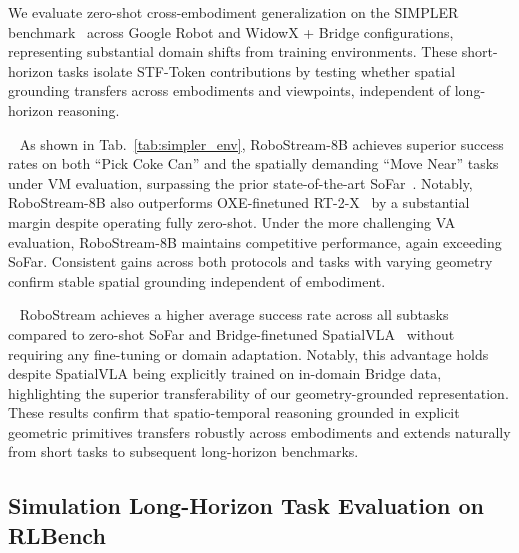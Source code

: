 We evaluate zero-shot cross-embodiment generalization on the SIMPLER benchmark~\cite{li2025evaluating} across Google Robot and WidowX + Bridge configurations, representing substantial domain shifts from training environments. These short-horizon tasks isolate STF-Token contributions by testing whether spatial grounding transfers across embodiments and viewpoints, independent of long-horizon reasoning.

~
As shown in Tab.~\ref{tab:simpler_env}, RoboStream-8B achieves superior success rates on both ``Pick Coke Can'' and the spatially demanding ``Move Near'' tasks under VM evaluation, surpassing the prior state-of-the-art SoFar~\cite{qisofar}. Notably, RoboStream-8B also outperforms OXE-finetuned RT-2-X~\cite{zitkovich2023rt} by a substantial margin despite operating fully zero-shot. Under the more challenging VA evaluation, RoboStream-8B maintains competitive performance, again exceeding SoFar. Consistent gains across both protocols and tasks with varying geometry confirm stable spatial grounding independent of embodiment.

~
RoboStream achieves a higher average success rate across all subtasks compared to zero-shot SoFar and Bridge-finetuned SpatialVLA~\cite{qu2025spatialvla} without requiring any fine-tuning or domain adaptation. Notably, this advantage holds despite SpatialVLA being explicitly trained on in-domain Bridge data, highlighting the superior transferability of our geometry-grounded representation. These results confirm that spatio-temporal reasoning grounded in explicit geometric primitives transfers robustly across embodiments and extends naturally from short tasks to subsequent long-horizon benchmarks.





\subsection{Simulation Long-Horizon Task Evaluation on RLBench}
\label{sec:rlbench}


